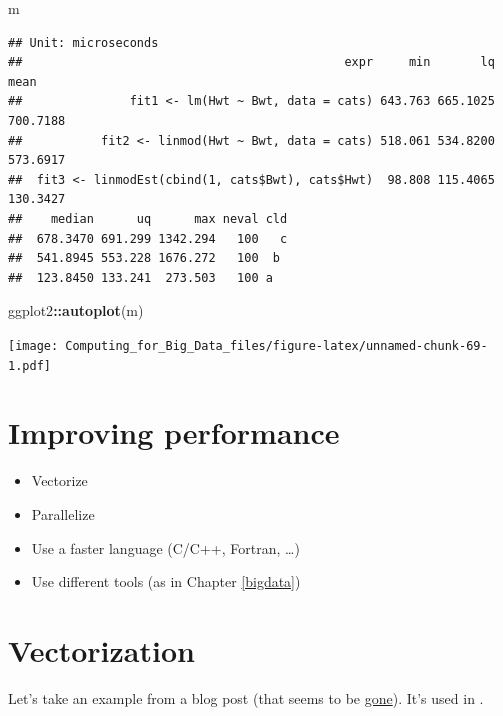 \documentclass[]{book}
\newenvironment{Shaded}{\begin{snugshade}}{\end{snugshade}}
\newcommand{\KeywordTok}[1]{\textcolor[rgb]{0.13,0.29,0.53}{\textbf{#1}}}
\newcommand{\OperatorTok}[1]{\textcolor[rgb]{0.81,0.36,0.00}{\textbf{#1}}}
\newcommand{\NormalTok}[1]{#1}
\theoremstyle{definition}
\theoremstyle{definition}
\theoremstyle{definition}
\theoremstyle{remark}
\begin{document}
\begin{Shaded}
\begin{Highlighting}[]
\NormalTok{m}
\end{Highlighting}
\end{Shaded}

\begin{verbatim}
## Unit: microseconds
##                                             expr     min       lq     mean
##               fit1 <- lm(Hwt ~ Bwt, data = cats) 643.763 665.1025 700.7188
##           fit2 <- linmod(Hwt ~ Bwt, data = cats) 518.061 534.8200 573.6917
##  fit3 <- linmodEst(cbind(1, cats$Bwt), cats$Hwt)  98.808 115.4065 130.3427
##    median      uq      max neval cld
##  678.3470 691.299 1342.294   100   c
##  541.8945 553.228 1676.272   100  b 
##  123.8450 133.241  273.503   100 a
\end{verbatim}

\begin{Shaded}
\begin{Highlighting}[]
\NormalTok{ggplot2}\OperatorTok{::}\KeywordTok{autoplot}\NormalTok{(m)}
\end{Highlighting}
\end{Shaded}

\texttt{[image: Computing\_for\_Big\_Data\_files/figure-latex/unnamed-chunk-69-1.pdf]}

\section{Improving performance}\label{improving-performance}

\begin{itemize}
\item
  Vectorize
\item
  Parallelize
\item
  Use a faster language (C/C++, Fortran, \ldots{})
\item
  Use different tools (as in Chapter \ref{bigdata})
\end{itemize}

\section{Vectorization}\label{vectorization}

Let's take an example from a blog post (that seems to be
\href{http://www.babelgraph.org/wp/?p=358}{gone}). It's used in
\citet[Section
\href{http://adv-r.had.co.nz/Rcpp.html\#rcpp-case-studies}{Case
studies}]{Wickham2014}.
\end{document}
